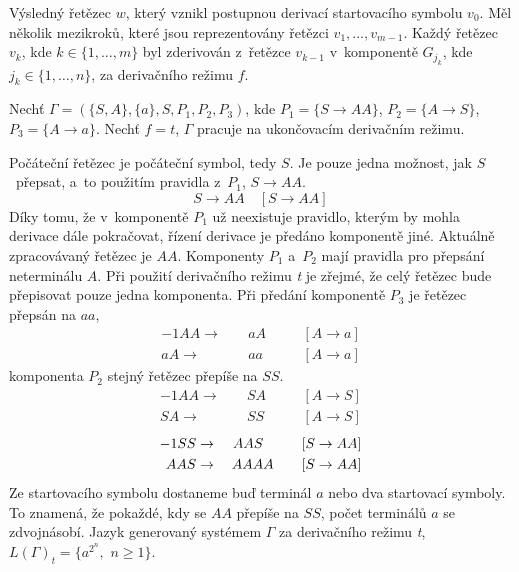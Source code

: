 Výsledný řetězec $w$, který vznikl postupnou derivací startovacího symbolu $v_0$.
Měl několik mezikroků, které jsou reprezentovány řetězci $v_1, \ldots, v_{m-1}$.
Každý řetězec $v_k$, kde $k \in \{1, \ldots, m\}$ byl zderivován z~řetězce $v_{k-1}$ v~komponentě $G_{j_{k}}$, kde $j_k \in \{1, \ldots, n\}$, za derivačního režimu $f$.

\begin{example}
    Nechť $\Gamma = (\{S, A\}, \{a\}, S, P_1, P_2, P_3)$, kde $P_1 = \{S \rightarrow AA\}$, $P_2 = \{A \rightarrow S\}$, $P_3 = \{A \rightarrow a\}$.
    Nechť $f = t$, $\Gamma$ pracuje na ukončovacím derivačním režimu.

    Počáteční řetězec je počáteční symbol, tedy $S$. 
    Je pouze jedna možnost, jak $S$~přepsat, a~to použitím pravidla z~$P_1$, $S \rightarrow AA$.
    \begin{equation*}
        S \rightarrow AA \quad [S \rightarrow AA]
    \end{equation*}
    Díky tomu, že v~komponentě $P_1$ už neexistuje pravidlo, kterým by mohla derivace dále pokračovat, řízení derivace je předáno komponentě jiné.
    Aktuálně zpracovávaný řetězec je $AA$.
    Komponenty $P_1$ a~$P_2$ mají pravidla pro přepsání neterminálu $A$.
    Při použití derivačního režimu \emph{t} je zřejmé, že celý řetězec bude přepisovat pouze jedna komponenta.
    Při předání komponentě $P_3$ je řetězec přepsán na $aa$,
    \begin{alignat*}{-1}
        AA \rightarrow&&\; aA \quad &&[A \rightarrow a] \\
        aA \rightarrow&&\; aa \,\quad &&[A \rightarrow a]
    \end{alignat*}
    komponenta $P_2$ stejný řetězec přepíše na $SS$.
    \begin{alignat*}{-1}
        AA  \rightarrow&&\; SA && \quad [A \rightarrow S] \\
        SA  \rightarrow&&\; SS && \quad [A \rightarrow S] 
    \end{alignat*}
    \begin{alignat*}{-1}
         SS \rightarrow&&\; AAS  \hphantom{A} \quad  &&[S \rightarrow AA] \\ 
        AAS \rightarrow&&\; AAAA \quad &&[S \rightarrow AA]
    \end{alignat*}
    Ze startovacího symbolu dostaneme buď terminál $a$ nebo dva startovací symboly.
    To znamená, že pokaždé, kdy se $AA$ přepíše na $SS$, počet terminálů $a$ se zdvojnásobí.
    Jazyk generovaný systémem $\Gamma$ za derivačního režimu \emph{t}, $L(\Gamma)_t = \{a^{2^n},$ $n \geq 1 \}$.
\end{example}

